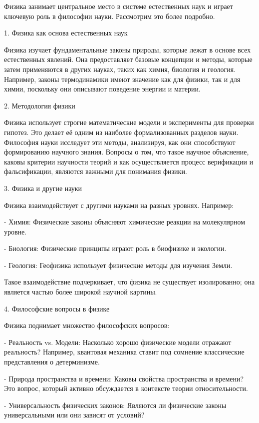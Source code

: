 \documentclass[exam_answers.tex]{subfiles}
\begin{document}
\renewcommand{\baselinestretch}{\blch}

Физика занимает центральное место в системе естественных наук и играет ключевую роль в философии науки.
Рассмотрим это более подробно.

1. Физика как основа естественных наук

Физика изучает фундаментальные законы природы, которые лежат в основе всех естественных явлений.
Она предоставляет базовые концепции и методы, которые затем применяются в других науках, таких как химия, биология и геология.
Например, законы термодинамики имеют значение как для физики, так и для химии, поскольку они описывают поведение энергии и материи.

2. Методология физики

Физика использует строгие математические модели и эксперименты для проверки гипотез.
Это делает её одним из наиболее формализованных разделов науки. Философия науки исследует эти методы, анализируя, как они способствуют формированию научного знания.
Вопросы о том, что такое научное объяснение, каковы критерии научности теорий и как осуществляется процесс верификации и фальсификации, являются важными для понимания физики.

3. Физика и другие науки

Физика взаимодействует с другими науками на разных уровнях. Например:

- Химия: Физические законы объясняют химические реакции на молекулярном уровне.

- Биология: Физические принципы играют роль в биофизике и экологии.

- Геология: Геофизика использует физические методы для изучения Земли.

Такое взаимодействие подчеркивает, что физика не существует изолированно; она является частью более широкой научной картины.

4. Философские вопросы в физике

Физика поднимает множество философских вопросов:

- Реальность vs. Модели: Насколько хорошо физические модели отражают реальность? Например, квантовая механика ставит под сомнение классические представления о детерминизме.

- Природа пространства и времени: Каковы свойства пространства и времени? Это вопрос, который активно обсуждается в контексте теории относительности.

- Универсальность физических законов: Являются ли физические законы универсальными или они зависят от условий?
\end{document}
